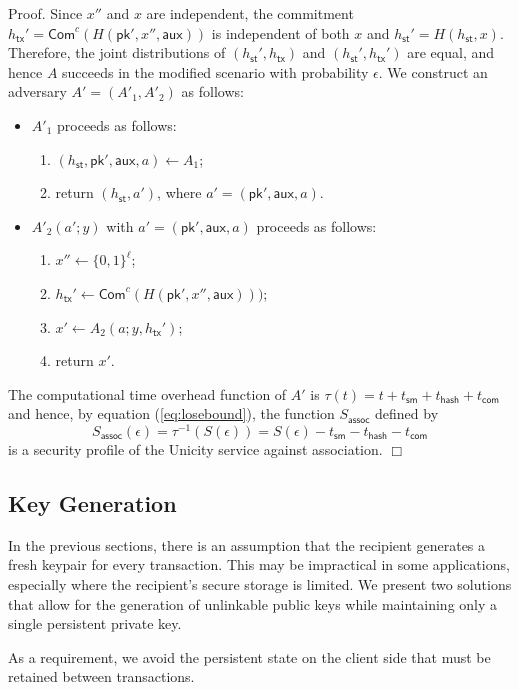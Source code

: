 \documentclass{article}
\newenvironment{proof}{\textsf{Proof}.}{\hfill$\Box$}
\newcommand{\pubkey}[0]{\mathsf{pk}}
\newcommand{\commitc}[0]{\mathsf{Com}^{c}}
\newcommand{\sthash}[0]{h_\mathsf{st}}
\newcommand{\txhash}[0]{h_\mathsf{tx}}
\newcommand{\auxd}[0]{\mathsf{aux}}
\begin{document}
\begin{proof}
Since $x''$ and $x$ are independent, the commitment $\txhash'=\commitc(H(\pubkey',x'',\auxd))$ is independent of both $x$ and $\sthash'=H(\sthash,x)$. Therefore, the joint distributions of $(\sthash',\txhash)$ and $(\sthash',\txhash')$ are equal, and hence $A$ succeeds in the modified scenario with probability $\epsilon$. We construct an adversary $A'=(A'_1,A'_2)$ as follows:
\begin{itemize}
\item $A'_1$ proceeds as follows:
\begin{enumerate}
\item $(\sthash, \pubkey', \auxd, a)\gets A_1$;
\item return $(\sthash, a')$, where $a'=(\pubkey', \auxd, a)$.
\end{enumerate}
\item $A'_2(a';y)$ with $a'=(\pubkey', \auxd, a)$ proceeds as follows:
\begin{enumerate}
\item $x''\gets \{0,1\}^\ell$;
\item $\txhash'\gets\commitc(H(\pubkey',x'',\auxd)))$;
\item $x'\gets A_2(a; y,\txhash')$;
\item return $x'$.
\end{enumerate}
\end{itemize}

\noindent The computational time overhead function of $A'$ is $\tau(t) = t + t_\mathsf{sm} + t_\mathsf{hash} + t_\mathsf{com}$ and hence, by equation (\ref{eq:losebound}), the function $S_\mathsf{assoc}$ defined by
\[
S_\mathsf{assoc}(\epsilon) = \tau^{-1}(S(\epsilon)) = S(\epsilon) - t_\mathsf{sm} - t_\mathsf{hash} - t_\mathsf{com}
\]
is a security profile of the Unicity service against association.
\end{proof}

\subsection{Key Generation}

In the previous sections, there is an assumption that the recipient generates a fresh keypair for every transaction. This may be impractical in some applications, especially where the recipient's secure storage is limited. We present two solutions that allow for the generation of unlinkable public keys while maintaining only a single persistent private key.

As a requirement, we avoid the persistent state on the client side that must be retained between transactions.
\end{document}

